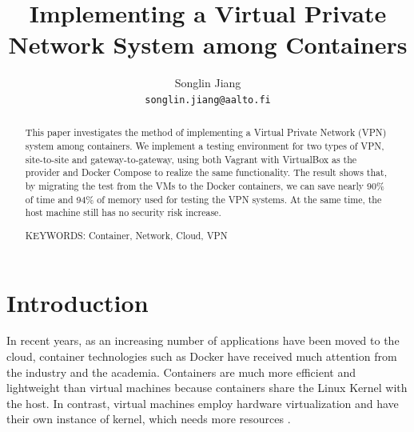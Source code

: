 \documentclass[article]{aaltoseries}
\begin{document}
 

\title{Implementing a Virtual Private Network System among Containers}

\author{Songlin Jiang%
\\\textnormal{\texttt{songlin.jiang@aalto.fi}}} %


\maketitle


\begin{abstract}
This paper investigates the method of implementing a Virtual Private Network (VPN) system among containers. We implement a testing environment for two types of VPN, site-to-site and gateway-to-gateway, using both Vagrant with VirtualBox as the provider and Docker Compose to realize the same functionality. The result shows that, by migrating the test from the VMs to the Docker containers, we can save nearly 90\% of time and 94\% of memory used for testing the VPN systems. At the same time, the host machine still has no security risk increase.

\vspace{3mm}
\noindent KEYWORDS: Container, Network, Cloud, VPN

\end{abstract}




\section{Introduction}

In recent years, as an increasing number of applications have been moved to the cloud, container technologies such as Docker have received much attention from the industry and the academia. Containers are much more efficient and lightweight than virtual machines because containers share the Linux Kernel with the host. In contrast, virtual machines employ hardware virtualization and have their own instance of kernel, which needs more resources \cite{10.1145/2988336.2988337}.
\end{document}
